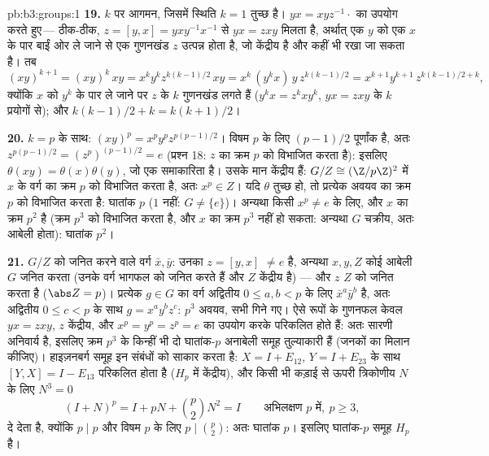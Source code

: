 \begin{solution}{pb:b3:groups:1}
\textbf{19.} $k$ पर आगमन, जिसमें स्थिति $k = 1$ तुच्छ है। $yx = xyz^{-1}\cdot$ का
उपयोग करते हुए\,--- ठीक-ठीक, $z = [y, x] =
yxy^{-1}x^{-1}$ से $yx = zxy$ मिलता है, अर्थात् एक
$y$ को एक $x$ के पार बाईं ओर ले जाने से एक गुणनखंड $z$ उत्पन्न
होता है, जो केंद्रीय है और कहीं भी रखा जा सकता है। तब
\[
(xy)^{k+1} = (xy)^k\,xy = x^ky^kz^{k(k-1)/2}\,xy
= x^k\,(y^kx)\,y\,z^{k(k-1)/2}
= x^{k+1}y^{k+1}\,z^{k(k-1)/2 + k},
\]
क्योंकि $x$ को $y^k$ के पार ले जाने पर $z$ के $k$ गुणनखंड
लगते हैं ($y^kx =
z^kxy^k$, $yx = zxy$ के $k$ प्रयोगों से); और $k(k-1)/2 + k
= k(k+1)/2$।

\textbf{20.} $k = p$ के साथ: $(xy)^p = x^py^pz^{p(p-1)/2}$। विषम $p$ के लिए $(p-1)/2$ पूर्णांक
है, अतः $z^{p(p-1)/2} =
(z^p)^{(p-1)/2} = e$ (प्रश्न 18: $z$ का क्रम $p$ को विभाजित करता है):
इसलिए $\theta(xy) = \theta(x)\theta(y)$, जो एक समाकारिता है। उसके मान केंद्रीय हैं: $G/Z \cong (\Z/p\Z)^2$ में
$x$ के वर्ग का क्रम $p$ को विभाजित करता है, अतः $x^p \in Z$। यदि $\theta$
तुच्छ हो, तो प्रत्येक अवयव का क्रम $p$ को विभाजित करता है: घातांक
$p$ ($1$ नहीं: $G \neq
\{e\}$)। अन्यथा किसी $x^p \neq e$ के लिए, और $x$ का
क्रम $p^2$ है (क्रम $p^3$ को विभाजित करता है, और $x$ का क्रम $p^3$
नहीं हो सकता: अन्यथा $G$ चक्रीय, अतः आबेली होता): घातांक $p^2$।

\textbf{21.} $G/Z$ को जनित करने वाले वर्ग $\bar x, \bar y$: उनका 
$z = [y, x]$ $\neq e$ है, अन्यथा $x, y, Z$ कोई आबेली $G$ जनित करता (उनके वर्ग
भागफल को जनित करते हैं और $Z$ केंद्रीय है) --- और $z$ $Z$ को
जनित करता है ($\abs Z = p$)। प्रत्येक $g \in G$ का वर्ग अद्वितीय $0 \leq a, b <
p$ के लिए
$\bar x^a\bar y^b$ है, अतः अद्वितीय $0 \leq c < p$ के साथ $g = x^ay^bz^c$: $p^3$ अवयव, सभी गिने
गए। ऐसे  रूपों के गुणनफल केवल $yx = zxy$, $z$ केंद्रीय, और
$x^p = y^p =
z^p = e$ का उपयोग करके परिकलित होते हैं: अतः सारणी अनिवार्य है, इसलिए
क्रम $p^3$ के किन्हीं भी दो घातांक-$p$ अनाबेली समूह तुल्याकारी हैं
(जनकों का मिलान कीजिए)। हाइज़नबर्ग समूह इन संबंधों को साकार करता
है: $X = I + E_{12}$, $Y = I + E_{23}$ के साथ $[Y, X] = I -
E_{13}$ परिकलित होता है ($H_p$ में केंद्रीय),
और किसी भी कड़ाई से ऊपरी त्रिकोणीय $N$ के लिए $N^3 = 0$
\[
(I + N)^p = I + pN + \binom p2N^2 = I
\qquad\text{अभिलक्षण } p \text{ में},\ p \geq 3,
\]
दे देता है, क्योंकि $p \mid p$ और विषम $p$ के लिए $p \mid \binom p2$: अतः घातांक
$p$। इसलिए घातांक-$p$ समूह $H_p$ है।


\end{solution}
